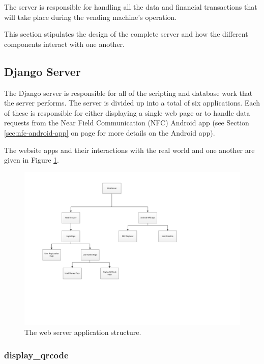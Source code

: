 The server is responsible for handling all the data and financial transactions
that will take place during the vending machine's operation. 

This section stipulates the design of the complete server and how the different
components interact with one another. 

\subsection{Django Server}

The Django server is responsible for all of the scripting and database work
that the server performs. The server is divided up into a total of six
applications. Each of these is responsible for either displaying a single web
page or to handle data requests from the Near Field Communication (NFC) Android
app (see Section \ref{sec:nfc-android-app} on page \pageref{sec:nfc-android-app}
for more details on the Android app).

The website apps and their interactions with the real world and one another
are given in Figure \ref{fig:website-apps}.

\begin{figure}
 \centering 
 \includegraphics[clip=true, trim = 0 130 130 30,
 scale=0.7]{website_structure}
 \caption{The web server application structure.}
 \label{fig:website-apps}
\end{figure}

\subsubsection{display\_qrcode}

